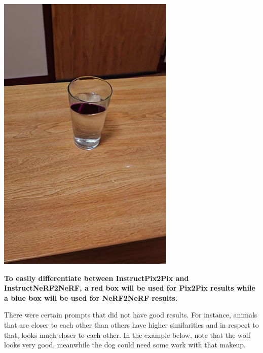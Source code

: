 \documentclass{article}
\begin{document}
\begin{center}
    \begin{tcolorbox}[
                      boxsep=0pt,
                      top=2pt,
                      colback=red!5!white,
                      colframe=red!75!black,
                      center title,
                      autowidth title=turn the cup into a glass of wine
                      ]
        \begin{center}
            \includegraphics[scale=0.15]{images/wine.png}
        \end{center}
    \end{tcolorbox}
\end{center}
\begin{center}
    \begin{tcolorbox}
        \textbf{ To easily differentiate between InstructPix2Pix and InstructNeRF2NeRF, a red box will be used for Pix2Pix results while a blue box will be used for NeRF2NeRF results. }
    \end{tcolorbox}
\end{center}

\newpage
There were certain prompts that did not have good results. For instance, animals that are closer to each other than others have higher similarities and in respect to that, looks much closer to each other. In the example below, note that the wolf looks very good, meanwhile the dog could need some work with that makeup.
\end{document}
